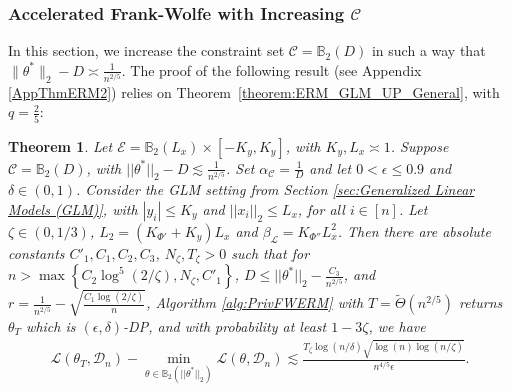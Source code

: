 \documentclass{article}
\newtheorem{theorem}{Theorem}
\begin{document}



\subsubsection{Accelerated Frank-Wolfe with Increasing $\mathcal{C}$}\label{sec:Increasing C}

In this section, we increase the constraint set $\mathcal{C} = \mathbb{B}_2(D)$ in such a way that $\|\theta^*\|_2 - D \asymp \frac{1}{n^{2/5}}$.
The proof of the following result (see Appendix \ref{AppThmERM2}) relies on Theorem~\ref{theorem:ERM_GLM_UP_General}, with $q = \frac{2}{5}$:

\begin{theorem}
\label{theorem:ERM_UP_C_Inc}
Let $\mathcal{E} = \mathbb{B}_2(L_x)\times [-K_y, K_y]$, with $K_y, L_x \asymp 1$. Suppose $\mathcal{C} = \mathbb{B}_{2}\left(D\right)$, with $||\theta^*||_2 - D \lesssim \frac{1}{n^{2/5}}$. Set $\alpha_{\mathcal{C}} = \frac{1}{D}$ and let $0 < \epsilon \le 0.9$ and $\delta \in (0, 1)$. Consider the GLM setting from Section \ref{sec:Generalized Linear Models (GLM)}, with $|y_i| \leq K_y$ and $||x_i||_2 \leq L_x$, for all $i \in [n]$. Let $\zeta \in (0, 1/3)$, $L_2 = (K_{\Phi'} + K_y)L_x$ and $\beta_{\mathcal{L}} = K_{\Phi''}L_x^2$. Then there are absolute constants $C'_1, C_1, C_2, C_3$, $N_\zeta, T_\zeta > 0$ such that for $n > \max\left\{C_2\log^5(2/\zeta), N_\zeta, C'_1\right\}$, $D \leq ||\theta^*||_2 - \frac{C_3}{n^{2/5}}$, and $r = \frac{1}{n^{2/5}} - \sqrt{\frac{C_1\log(2/\zeta)}{n}}$, Algorithm \ref{alg:PrivFWERM} with
$T = \widetilde{\Theta}\left(n^{2/5}\right)$
returns $\theta_T$ which is $(\epsilon, \delta)$-DP, and with probability at least $1 - 3\zeta$, we have
\begin{align}
\label{eq:Upper_ERM_GLM_Increasing_C}
\mathcal{L}(\theta_T, \mathcal{D}_n) - \mathop{\min}\limits_{\theta \in \mathbb{B}_2(||\theta^*||_2)}\mathcal{L}(\theta, \mathcal{D}_n) \lesssim \frac{T_\zeta\log(n/\delta)\sqrt{\log(n)\log(n/\zeta)}}{n^{4/5}\epsilon}.
\end{align} 
\end{theorem}
\end{document}
